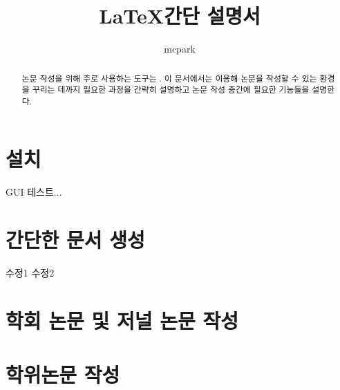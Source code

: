 \documentclass[a4paper, nobookmarks, subfigure, adjustmath, amsmath]{oblivoir}
\title{\LaTeX 간단 설명서}
\author{mcpark}
\begin{document}
\maketitle
\begin{abstract}
논문 작성을 위해 주로 사용하는 도구는 .
이 문서에서는  이용해 논문을 작성할 수 있는 환경을 꾸리는 데까지 필요한 과정을 간략히 설명하고 논문 작성 중간에 필요한  기능들을 설명한다.
\end{abstract}

\section{설치}
GUI 테스트...


\section{간단한 문서 생성}
수정1
수정2



\section{학회 논문 및 저널 논문 작성}


\section{학위논문 작성}
\end{document}
